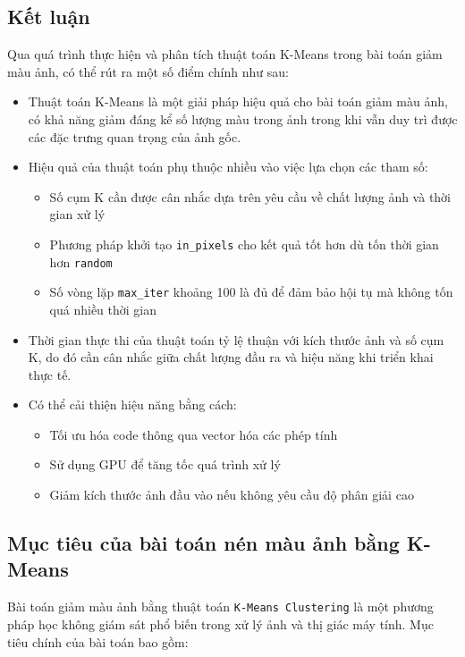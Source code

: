 \subsection{Kết luận}
Qua quá trình thực hiện và phân tích thuật toán K-Means trong bài toán giảm màu ảnh, có thể rút ra một số điểm chính như sau:

\begin{itemize}
	\item Thuật toán K-Means là một giải pháp hiệu quả cho bài toán giảm màu ảnh, có khả năng giảm đáng kể số lượng màu trong ảnh trong khi vẫn duy trì được các đặc trưng quan trọng của ảnh gốc.

	\item Hiệu quả của thuật toán phụ thuộc nhiều vào việc lựa chọn các tham số:
	      \begin{itemize}
		      \item Số cụm K cần được cân nhắc dựa trên yêu cầu về chất lượng ảnh và thời gian xử lý
		      \item Phương pháp khởi tạo \texttt{in\_pixels} cho kết quả tốt hơn dù tốn thời gian hơn \texttt{random}
		      \item Số vòng lặp \texttt{max\_iter} khoảng 100 là đủ để đảm bảo hội tụ mà không tốn quá nhiều thời gian
	      \end{itemize}

	\item Thời gian thực thi của thuật toán tỷ lệ thuận với kích thước ảnh và số cụm K, do đó cần cân nhắc giữa chất lượng đầu ra và hiệu năng khi triển khai thực tế.

	\item Có thể cải thiện hiệu năng bằng cách:
	      \begin{itemize}
		      \item Tối ưu hóa code thông qua vector hóa các phép tính
		      \item Sử dụng GPU để tăng tốc quá trình xử lý
		      \item Giảm kích thước ảnh đầu vào nếu không yêu cầu độ phân giải cao
	      \end{itemize}
\end{itemize}

\subsection{Mục tiêu của bài toán nén màu ảnh bằng K-Means}

Bài toán giảm màu ảnh bằng thuật toán \texttt{K-Means Clustering} là một phương pháp học không giám sát phổ biến trong xử lý ảnh và thị giác máy tính. Mục tiêu chính của bài toán bao gồm:

